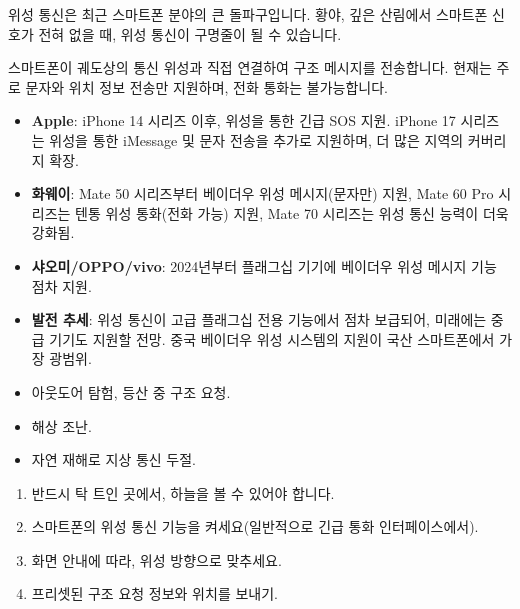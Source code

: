 


위성 통신은 최근 스마트폰 분야의 큰 돌파구입니다. 황야, 깊은 산림에서 스마트폰 신호가 전혀 없을 때, 위성 통신이 구명줄이 될 수 있습니다.


스마트폰이 궤도상의 통신 위성과 직접 연결하여 구조 메시지를 전송합니다. 현재는 주로 문자와 위치 정보 전송만 지원하며, 전화 통화는 불가능합니다.


\begin{itemize}
  \item \textbf{Apple}: iPhone 14 시리즈 이후, 위성을 통한 긴급 SOS 지원. iPhone 17 시리즈는 위성을 통한 iMessage 및 문자 전송을 추가로 지원하며, 더 많은 지역의 커버리지 확장.
  \item \textbf{화웨이}: Mate 50 시리즈부터 베이더우 위성 메시지(문자만) 지원, Mate 60 Pro 시리즈는 텐통 위성 통화(전화 가능) 지원, Mate 70 시리즈는 위성 통신 능력이 더욱 강화됨.
  \item \textbf{샤오미/OPPO/vivo}: 2024년부터 플래그십 기기에 베이더우 위성 메시지 기능 점차 지원.
  \item \textbf{발전 추세}: 위성 통신이 고급 플래그십 전용 기능에서 점차 보급되어, 미래에는 중급 기기도 지원할 전망. 중국 베이더우 위성 시스템의 지원이 국산 스마트폰에서 가장 광범위.
\end{itemize}


\begin{itemize}
  \item 아웃도어 탐험, 등산 중 구조 요청.
  \item 해상 조난.
  \item 자연 재해로 지상 통신 두절.
\end{itemize}


\begin{enumerate}
  \item 반드시 탁 트인 곳에서, 하늘을 볼 수 있어야 합니다.
  \item 스마트폰의 위성 통신 기능을 켜세요(일반적으로 긴급 통화 인터페이스에서).
  \item 화면 안내에 따라, 위성 방향으로 맞추세요.
  \item 프리셋된 구조 요청 정보와 위치를 보내기.
\end{enumerate}

